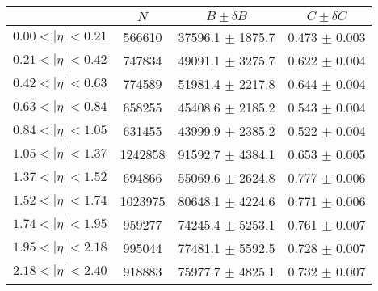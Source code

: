 \begin{tabular}{lccc}
\hline
    &   $N$   & $B \pm \delta B$  &  $C \pm \delta C$ \\
\hline
$0.00 < |\eta| <0.21$          & 566610     & 37596.1    $\pm$ 1875.7 & 0.473      $\pm$ 0.003 \\
$0.21 < |\eta| <0.42$          & 747834     & 49091.1    $\pm$ 3275.7 & 0.622      $\pm$ 0.004 \\
$0.42 < |\eta| <0.63$          & 774589     & 51981.4    $\pm$ 2217.8 & 0.644      $\pm$ 0.004 \\
$0.63 < |\eta| <0.84$          & 658255     & 45408.6    $\pm$ 2185.2 & 0.543      $\pm$ 0.004 \\
$0.84 < |\eta| <1.05$          & 631455     & 43999.9    $\pm$ 2385.2 & 0.522      $\pm$ 0.004 \\
$1.05 < |\eta| <1.37$          & 1242858    & 91592.7    $\pm$ 4384.1 & 0.653      $\pm$ 0.005 \\
$1.37 < |\eta| <1.52$          & 694866     & 55069.6    $\pm$ 2624.8 & 0.777      $\pm$ 0.006 \\
$1.52 < |\eta| <1.74$          & 1023975    & 80648.1    $\pm$ 4224.6 & 0.771      $\pm$ 0.006 \\
$1.74 < |\eta| <1.95$          & 959277     & 74245.4    $\pm$ 5253.1 & 0.761      $\pm$ 0.007 \\
$1.95 < |\eta| <2.18$          & 995044     & 77481.1    $\pm$ 5592.5 & 0.728      $\pm$ 0.007 \\
$2.18 < |\eta| <2.40$          & 918883     & 75977.7    $\pm$ 4825.1 & 0.732      $\pm$ 0.007 \\
\hline
\end{tabular}
